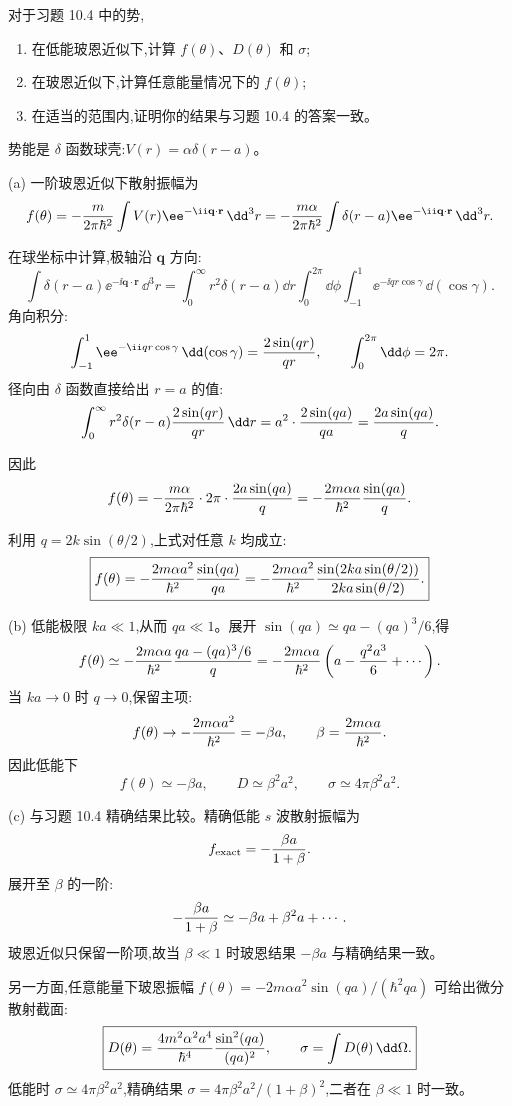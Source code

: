 \begin{question}
对于习题 10.4 中的势,
\begin{enumerate}
\item 在低能玻恩近似下,计算 $f(\theta)$、$D(\theta)$ 和 $\sigma$;
\item 在玻恩近似下,计算任意能量情况下的 $f(\theta)$;
\item 在适当的范围内,证明你的结果与习题 10.4 的答案一致。
\end{enumerate}
\end{question}
\begin{solution}
势能是 $\delta$ 函数球壳:$V(r)=\alpha\delta(r-a)$。

(a) 一阶玻恩近似下散射振幅为
\[
f(\theta)=-{m\over2\pi\hbar^2}\int V(r)\ee^{-\ii\mathbf q\cdot\mathbf r}\,\dd^3r
=-{m\alpha\over2\pi\hbar^2}\int \delta(r-a)\ee^{-\ii\mathbf q\cdot\mathbf r}\,\dd^3r.
\]

在球坐标中计算,极轴沿 $\mathbf q$ 方向:
\[
\int \delta(r-a)\ee^{-\ii\mathbf q\cdot\mathbf r}\,\dd^3r
=\int_0^\infty r^2\delta(r-a)\dd r\int_0^{2\pi}\dd\phi\int_{-1}^{1}\ee^{-\ii qr\cos\gamma}\,\dd(\cos\gamma).
\]
角向积分:
\[
\int_{-1}^{1}\ee^{-\ii qr\cos\gamma}\,\dd(\cos\gamma)={2\sin(qr)\over qr},
\qquad\int_0^{2\pi}\dd\phi=2\pi.
\]
径向由 $\delta$ 函数直接给出 $r=a$ 的值:
\[
\int_0^\infty r^2\delta(r-a){2\sin(qr)\over qr}\,\dd r
=a^2\cdot{2\sin(qa)\over qa}={2a\sin(qa)\over q}.
\]

因此
\[
f(\theta)=-{m\alpha\over2\pi\hbar^2}\cdot2\pi\cdot{2a\sin(qa)\over q}
=-{2m\alpha a\over\hbar^2}{\sin(qa)\over q}.
\]

利用 $q=2k\sin(\theta/2)$,上式对任意 $k$ 均成立:
\[
\boxed{f(\theta)=-{2m\alpha a^2\over\hbar^2}{\sin(qa)\over qa}
=-{2m\alpha a^2\over\hbar^2}{\sin(2ka\sin(\theta/2))\over 2ka\sin(\theta/2)}.}
\]

(b) 低能极限 $ka\ll1$,从而 $qa\ll1$。展开 $\sin(qa)\simeq qa-(qa)^3/6$,得
\[
f(\theta)\simeq-{2m\alpha a\over\hbar^2}{qa-(qa)^3/6\over q}
=-{2m\alpha a\over\hbar^2}\left(a-{q^2a^3\over6}+\cdots\right).
\]
当 $ka\to0$ 时 $q\to0$,保留主项:
\[
f(\theta)\to-{2m\alpha a^2\over\hbar^2}=-\beta a,
\qquad\beta={2m\alpha a\over\hbar^2}.
\]
因此低能下
\[
\boxed{f(\theta)\simeq -\beta a,\qquad
D\simeq \beta^2a^2,\qquad
\sigma\simeq 4\pi\beta^2a^2.}
\]

(c) 与习题 10.4 精确结果比较。精确低能 $s$ 波散射振幅为
\[
f_{\text{exact}}=-{\beta a\over1+\beta}.
\]
展开至 $\beta$ 的一阶:
\[
-{\beta a\over1+\beta}\simeq-\beta a+\beta^2a+\cdots.
\]
玻恩近似只保留一阶项,故当 $\beta\ll1$ 时玻恩结果 $-\beta a$ 与精确结果一致。

另一方面,任意能量下玻恩振幅 $f(\theta)=-2m\alpha a^2\sin(qa)/(\hbar^2qa)$ 可给出微分散射截面:
\[
\boxed{D(\theta)={4m^2\alpha^2a^4\over\hbar^4}{\sin^2(qa)\over(qa)^2},
\qquad
\sigma=\int D(\theta)\,\dd\Omega.}
\]
低能时 $\sigma\simeq 4\pi\beta^2a^2$,精确结果 $\sigma=4\pi\beta^2a^2/(1+\beta)^2$,二者在 $\beta\ll1$ 时一致。
\end{solution}

